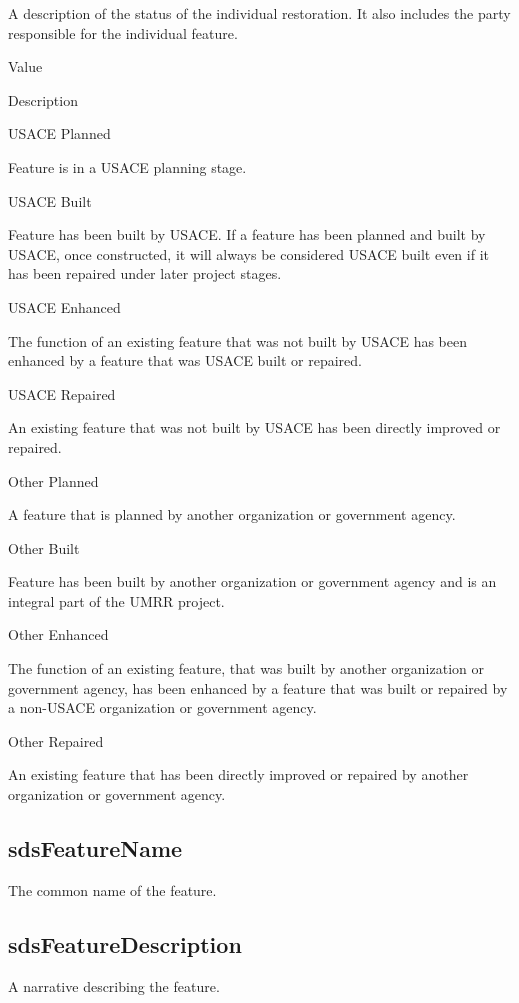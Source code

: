 \documentclass[
  letterpaper,
  DIV=11,
  numbers=noendperiod]{scrreprt}
\begin{document}
A description of the status of the individual restoration. It also
includes the party responsible for the individual feature.

Value

Description

USACE Planned

Feature is in a USACE planning stage.

USACE Built

Feature has been built by USACE. If a feature has been planned and built
by USACE, once constructed, it will always be considered USACE built
even if it has been repaired under later project stages.

USACE Enhanced

The function of an existing feature that was not built by USACE has been
enhanced by a feature that was USACE built or repaired.

USACE Repaired

An existing feature that was not built by USACE has been directly
improved or repaired.

Other Planned

A feature that is planned by another organization or government agency.

Other Built

Feature has been built by another organization or government agency and
is an integral part of the UMRR project.

Other Enhanced

The function of an existing feature, that was built by another
organization or government agency, has been enhanced by a feature that
was built or repaired by a non-USACE organization or government agency.

Other Repaired

An existing feature that has been directly improved or repaired by
another organization or government agency.

\subsection{sdsFeatureName}\label{sdsfeaturename-24}

The common name of the feature.

\subsection{sdsFeatureDescription}\label{sdsfeaturedescription-24}

A narrative describing the feature.
\end{document}
